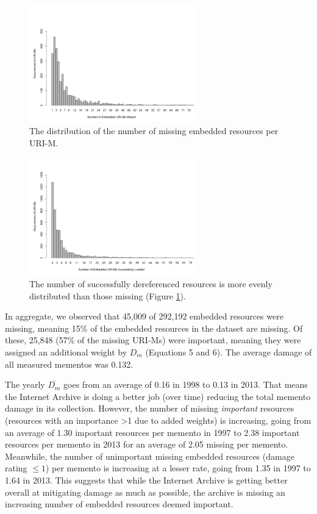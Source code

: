 \begin{figure}[h!]
\includegraphics[width=270px]{./imgs/occStats.png}
\caption{The distribution of the number of missing embedded resources per URI-M.}
\label{missingDistro}
\end{figure}

\begin{figure}[h!]
\includegraphics[width=270px]{./imgs/occStatsFound.png}
\caption{The number of successfully dereferenced resources is more evenly distributed than those missing (Figure \ref{missingDistro}).}
\label{foundDistro}
\end{figure}



In aggregate, we observed that 45,009 of 292,192 embedded resources were missing, meaning 15\% of the embedded resources in the dataset are missing. Of these, 25,848  (57\% of the missing URI-Ms) were important, meaning they were assigned an additional weight by $D_m$ (Equations 5 and 6). The average damage of all measured mementos was 0.132.

The yearly $\overline{D_m}$ goes from an average of 0.16 in 1998 to 0.13 in 2013. That means the Internet Archive is doing a better job (over time) reducing the total memento damage in its collection. However, the number of missing \emph{important} resources (resources with an importance >1 due to added weights) is increasing, going from an average of 1.30 important resources per memento in 1997 to 2.38 important resources per memento in 2013 for an average of 2.05 missing per memento. Meanwhile, the number of unimportant missing embedded resources (damage rating $\leq 1$) per memento is increasing at a lesser rate, going from 1.35 in 1997 to 1.64 in 2013. This suggests that while the Internet Archive is getting better overall at mitigating damage as much as possible, the archive is missing an increasing number of embedded resources deemed important. 

